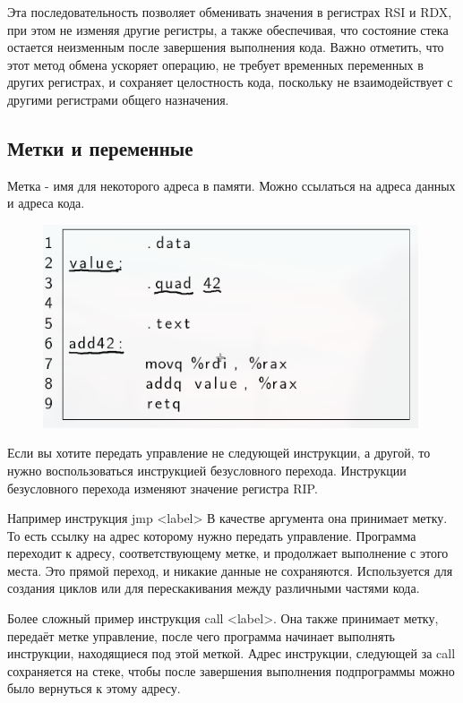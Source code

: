 	\par Эта последовательность позволяет обменивать значения в регистрах RSI и RDX, при этом не изменяя другие регистры, а также обеспечивая, что состояние стека остается неизменным после завершения выполнения кода. Важно отметить, что этот метод обмена ускоряет операцию, не требует временных переменных в других регистрах, и сохраняет целостность кода, поскольку не взаимодействует с другими регистрами общего назначения. 
	
	\subsection{Метки и переменные}
	
	\par Метка - имя для некоторого адреса в памяти. Можно ссылаться на адреса данных и адреса кода.
	
	\begin{figure}[h]
		\centering
		\includegraphics[height=6cm]{img/3.0} 
		\captionsetup{font=footnotesize} 
		\caption*{} 
	\end{figure}
	
	\par Если вы хотите передать управление не следующей инструкции, а другой, то нужно воспользоваться инструкцией безусловного перехода. Инструкции безусловного перехода изменяют значение регистра RIP.
	
	\par Например инструкция jmp <label> В качестве аргумента она принимает метку. То есть ссылку на адрес которому нужно передать управление. Программа переходит к адресу, соответствующему метке, и продолжает выполнение с этого места. Это прямой переход, и никакие данные не сохраняются. Используется для создания циклов или для перескакивания между различными частями кода.
	
	\par Более сложный пример инструкция call <label>. Она также принимает метку, передаёт метке управление, после чего программа начинает выполнять инструкции, находящиеся под этой меткой. Адрес инструкции, следующей за call сохраняется на стеке, чтобы после завершения выполнения подпрограммы можно было вернуться к этому адресу.
	
